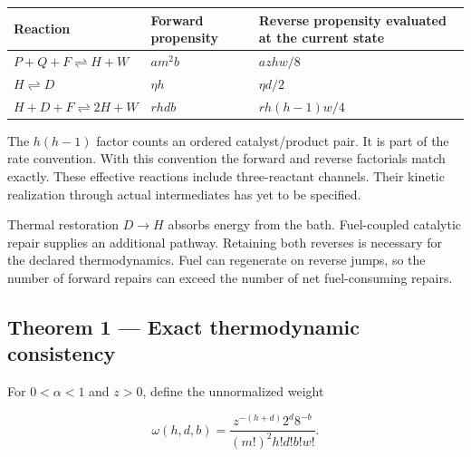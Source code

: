\documentclass[
  11pt,
]{article}
\newcounter{none} %
\begin{document}
{\def\LTcaptype{none} %
\begin{longtable}[]{@{}
  >{\raggedright\arraybackslash}p{}
  >{\raggedright\arraybackslash}p{}
  >{\raggedright\arraybackslash}p{}@{}}
\toprule\noalign{}
\begin{minipage}[b]{\linewidth}\raggedright
Reaction
\end{minipage} & \begin{minipage}[b]{\linewidth}\raggedright
Forward propensity
\end{minipage} & \begin{minipage}[b]{\linewidth}\raggedright
Reverse propensity evaluated at the current state
\end{minipage} \\
\midrule\noalign{}
\endhead
\bottomrule\noalign{}
\endlastfoot
\(P+Q+F\rightleftharpoons H+W\) & \(a m^2b\) & \(azhw/8\) \\
\(H\rightleftharpoons D\) & \(\eta h\) & \(\eta d/2\) \\
\(H+D+F\rightleftharpoons2H+W\) & \(r hdb\) & \(r h(h-1)w/4\) \\
\end{longtable}
}

The \(h(h-1)\) factor counts an ordered catalyst/product pair. It is
part of the rate convention. With this convention the forward and
reverse factorials match exactly. These effective reactions include
three-reactant channels. Their kinetic realization through actual
intermediates has yet to be specified.

Thermal restoration \(D\to H\) absorbs energy from the bath.
Fuel-coupled catalytic repair supplies an additional pathway. Retaining
both reverses is necessary for the declared thermodynamics. Fuel can
regenerate on reverse jumps, so the number of forward repairs can exceed
the number of net fuel-consuming repairs.

\subsection{Theorem 1 --- Exact thermodynamic
consistency}\label{theorem-1-exact-thermodynamic-consistency}

For \(0<\alpha<1\) and \(z>0\), define the unnormalized weight

\[
\omega(h,d,b)=\frac{z^{-(h+d)}2^d8^{-b}}
{(m!)^2h!d!b!w!}.
\]
\end{document}
